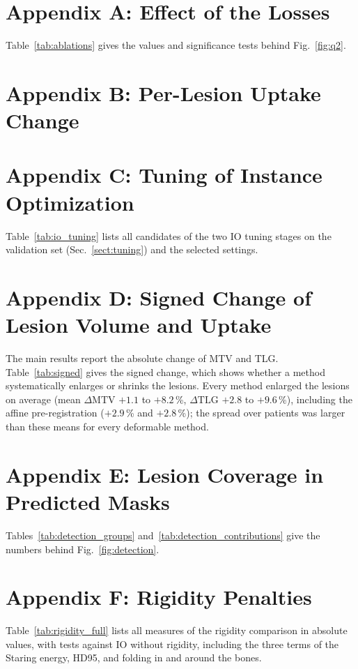 \section{Appendix A: Effect of the Losses}
\label{sect:app_ablations}
Table~\ref{tab:ablations} gives the values and significance tests behind Fig.~\ref{fig:q2}.


\section{Appendix B: Per-Lesion Uptake Change}
\label{sect:app_lesions_tlg}



\section{Appendix C: Tuning of Instance Optimization}
\label{sect:app_io_tuning}
Table~\ref{tab:io_tuning} lists all candidates of the two IO tuning stages on the validation set (Sec.~\ref{sect:tuning}) and the selected settings.


\section{Appendix D: Signed Change of Lesion Volume and Uptake}
\label{sect:app_signed}
The main results report the absolute change of MTV and TLG.
Table~\ref{tab:signed} gives the signed change, which shows whether a method systematically enlarges or shrinks the lesions.
Every method enlarged the lesions on average (mean $\Delta\mathrm{MTV}$ $+1.1$ to $+8.2$\,\%, $\Delta\mathrm{TLG}$ $+2.8$ to $+9.6$\,\%), including the affine pre-registration ($+2.9$\,\% and $+2.8$\,\%); the spread over patients was larger than these means for every deformable method.


\section{Appendix E: Lesion Coverage in Predicted Masks}
\label{sect:app_detection}
Tables~\ref{tab:detection_groups} and~\ref{tab:detection_contributions} give the numbers behind Fig.~\ref{fig:detection}.



\section{Appendix F: Rigidity Penalties}
\label{sect:app_rigidity}
Table~\ref{tab:rigidity_full} lists all measures of the rigidity comparison in absolute values, with tests against IO without rigidity, including the three terms of the Staring energy, HD95, and folding in and around the bones.


